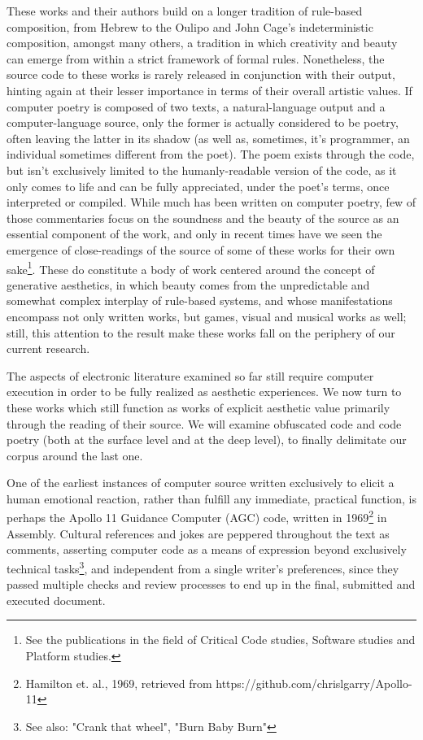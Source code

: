 \documentclass{article}
\begin{document}
These works and their authors build on a longer tradition of rule-based composition, from Hebrew to the Oulipo and John Cage's indeterministic composition, amongst many others\cite{cramer_words_2003}, a tradition in which creativity and beauty can emerge from within a strict framework of formal rules. Nonetheless, the source code to these works is rarely released in conjunction with their output, hinting again at their lesser importance in terms of their overall artistic values. If computer poetry is composed of two texts, a natural-language output and a computer-language source, only the former is actually considered to be poetry, often leaving the latter in its shadow (as well as, sometimes, it's programmer, an individual sometimes different from the poet). The poem exists through the code, but isn't exclusively limited to the humanly-readable version of the code, as it only comes to life and can be fully appreciated, under the poet's terms, once interpreted or compiled. While much has been written on computer poetry, few of those commentaries focus on the soundness and the beauty of the source as an essential component of the work, and only in recent times have we seen the emergence of close-readings of the source of some of these works for their own sake\footnote{See the publications in the field of Critical Code studies, Software studies and Platform studies.}. These do constitute a body of work centered around the concept of generative aesthetics\cite{goriunova_read_2005}, in which beauty comes from the unpredictable and somewhat complex interplay of rule-based systems, and whose manifestations encompass not only written works, but games, visual and musical works as well; still, this attention to the result make these works fall on the periphery of our current research.

The aspects of electronic literature examined so far still require computer execution in order to be fully realized as aesthetic experiences. We now turn to these works which still function as works of explicit aesthetic value primarily through the reading of their source. We will examine obfuscated code and code poetry (both at the surface level and at the deep level), to finally delimitate our corpus around the last one.

One of the earliest instances of computer source written exclusively to elicit a human emotional reaction, rather than fulfill any immediate, practical function, is perhaps the Apollo 11 Guidance Computer (AGC) code, written in 1969\footnote{Hamilton et. al., 1969, retrieved from https://github.com/chrislgarry/Apollo-11} in Assembly. Cultural references and jokes are peppered throughout the text as comments, asserting computer code as a means of expression beyond exclusively technical tasks\footnote{See also: "Crank that wheel", "Burn Baby Burn"}, and independent from a single writer's preferences, since they passed multiple checks and review processes to end up in the final, submitted and executed document.
\end{document}
